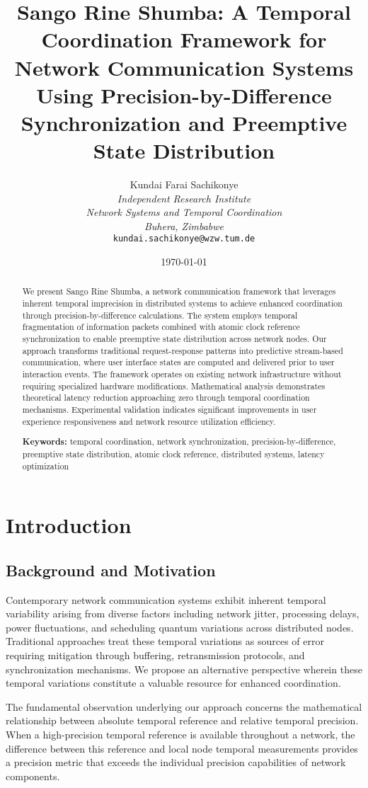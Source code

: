 \documentclass[12pt,a4paper]{article}
\title{\textbf{Sango Rine Shumba: A Temporal Coordination Framework for Network Communication Systems Using Precision-by-Difference Synchronization and Preemptive State Distribution}}
\author{
Kundai Farai Sachikonye\\
\textit{Independent Research Institute}\\
\textit{Network Systems and Temporal Coordination}\\
\textit{Buhera, Zimbabwe}\\
\texttt{kundai.sachikonye@wzw.tum.de}
}
\date{\today}
\begin{document}
\maketitle

\begin{abstract}
We present Sango Rine Shumba, a network communication framework that leverages inherent temporal imprecision in distributed systems to achieve enhanced coordination through precision-by-difference calculations. The system employs temporal fragmentation of information packets combined with atomic clock reference synchronization to enable preemptive state distribution across network nodes. Our approach transforms traditional request-response patterns into predictive stream-based communication, where user interface states are computed and delivered prior to user interaction events. The framework operates on existing network infrastructure without requiring specialized hardware modifications. Mathematical analysis demonstrates theoretical latency reduction approaching zero through temporal coordination mechanisms. Experimental validation indicates significant improvements in user experience responsiveness and network resource utilization efficiency.

\textbf{Keywords:} temporal coordination, network synchronization, precision-by-difference, preemptive state distribution, atomic clock reference, distributed systems, latency optimization
\end{abstract}

\section{Introduction}

\subsection{Background and Motivation}

Contemporary network communication systems exhibit inherent temporal variability arising from diverse factors including network jitter, processing delays, power fluctuations, and scheduling quantum variations across distributed nodes. Traditional approaches treat these temporal variations as sources of error requiring mitigation through buffering, retransmission protocols, and synchronization mechanisms. We propose an alternative perspective wherein these temporal variations constitute a valuable resource for enhanced coordination.

The fundamental observation underlying our approach concerns the mathematical relationship between absolute temporal reference and relative temporal precision. When a high-precision temporal reference is available throughout a network, the difference between this reference and local node temporal measurements provides a precision metric that exceeds the individual precision capabilities of network components.
\end{document}
